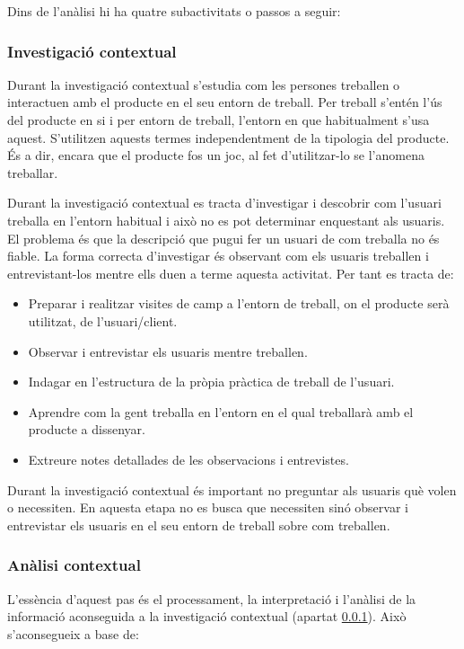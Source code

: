 Dins de l'anàlisi hi ha quatre subactivitats o passos a seguir:

\subsubsection{Investigació contextual}\label{subsec:investigacio_contextual}
Durant la investigació contextual s'estudia com les persones treballen o interactuen amb el producte en el seu entorn de treball. Per treball s'entén l'ús del producte en si i per entorn de treball, l'entorn en que habitualment s'usa aquest. S'utilitzen aquests termes independentment de la tipologia del producte. És a dir, encara que el producte fos un joc, al fet d'utilitzar-lo se l'anomena treballar. 

Durant la investigació contextual es tracta d'investigar i descobrir com l'usuari treballa en l'entorn habitual i això no es pot determinar enquestant als usuaris. El problema és que la descripció que pugui fer un usuari de com treballa no és fiable. La forma correcta d'investigar és observant com els usuaris treballen i entrevistant-los mentre ells duen a terme aquesta activitat. Per tant es tracta de:

\begin{itemize}
\item Preparar i realitzar visites de camp a l'entorn de treball, on el producte serà utilitzat, de l'usuari/client.
\item Observar i entrevistar els usuaris mentre treballen.
\item Indagar en l'estructura de la pròpia pràctica de treball de l'usuari.
\item Aprendre com la gent treballa en l'entorn en el qual treballarà amb el producte a dissenyar.
\item Extreure notes detallades de les observacions i entrevistes.
\end{itemize}

Durant la investigació contextual és important no preguntar als usuaris què volen o necessiten. En aquesta etapa no es busca que necessiten sinó observar i entrevistar els usuaris en el seu entorn de treball sobre com treballen.


\subsubsection{Anàlisi contextual}\label{subsec:analisi_contextual}
L'essència d'aquest pas és el processament, la interpretació i l'anàlisi de la informació aconseguida a la investigació contextual (apartat \ref{subsec:investigacio_contextual}). Això s'aconsegueix a base de:

